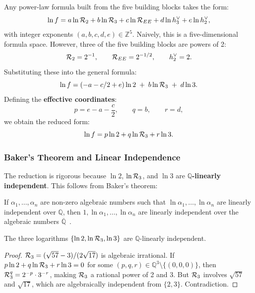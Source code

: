 Any power-law formula built from the five building blocks takes the form:
\begin{equation}
\ln f = a \ln\mathcal{R}_2 + b \ln\mathcal{R}_3 + c \ln\mathcal{R}_{EE} + d \ln h^\vee_3 + e \ln h^\vee_2,
\end{equation}
with integer exponents $(a, b, c, d, e) \in \mathbb{Z}^5$. Naively, this is a five-dimensional formula space. However, three of the five building blocks are powers of 2:
\begin{equation}
\mathcal{R}_2 = 2^{-1}, \qquad \mathcal{R}_{EE} = 2^{-1/2}, \qquad h^\vee_2 = 2.
\end{equation}
Substituting these into the general formula:
\begin{equation}
\ln f = (-a - c/2 + e) \ln 2 \;+\; b \ln\mathcal{R}_3 \;+\; d \ln 3.
\end{equation}
Defining the \textbf{effective coordinates}:
\begin{equation}
p = e - a - \frac{c}{2}, \qquad q = b, \qquad r = d,
\end{equation}
we obtain the reduced form:
\begin{equation}
\ln f = p \ln 2 + q \ln\mathcal{R}_3 + r \ln 3.
\end{equation}

\subsubsection{Baker's Theorem and Linear Independence}

The reduction is rigorous because $\ln 2$, $\ln\mathcal{R}_3$, and $\ln 3$ are \textbf{$\mathbb{Q}$-linearly independent}. This follows from Baker's theorem:

\begin{theorem}[Baker, 1966]\label{thm:baker}
If $\alpha_1, \ldots, \alpha_n$ are non-zero algebraic numbers such that $\ln\alpha_1, \ldots, \ln\alpha_n$ are linearly independent over $\mathbb{Q}$, then $1, \ln\alpha_1, \ldots, \ln\alpha_n$ are linearly independent over the algebraic numbers $\overline{\mathbb{Q}}$~\cite{baker1966linear}.
\end{theorem}

\begin{corollary}\label{cor:linear_independence}
The three logarithms $\{\ln 2, \ln\mathcal{R}_3, \ln 3\}$ are $\mathbb{Q}$-linearly independent.
\end{corollary}

\begin{proof}
$\mathcal{R}_3 = (\sqrt{57}-3)/(2\sqrt{17})$ is algebraic irrational. If $p \ln 2 + q \ln\mathcal{R}_3 + r \ln 3 = 0$ for some $(p, q, r) \in \mathbb{Q}^3 \setminus \{(0,0,0)\}$, then $\mathcal{R}_3^q = 2^{-p} \cdot 3^{-r}$, making $\mathcal{R}_3$ a rational power of 2 and 3. But $\mathcal{R}_3$ involves $\sqrt{57}$ and $\sqrt{17}$, which are algebraically independent from $\{2, 3\}$. Contradiction.
\end{proof}

